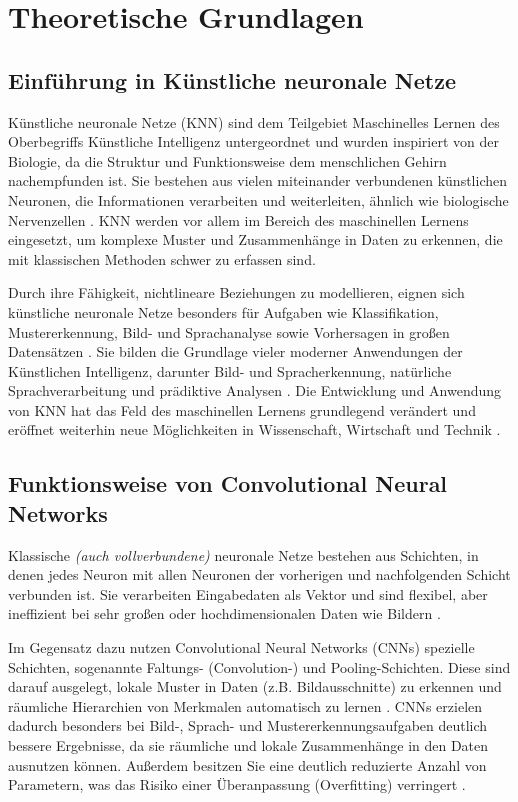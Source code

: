 \chapter{Theoretische Grundlagen} 

\label{TheoretischeGrundlagen} 

\section{Einführung in Künstliche neuronale Netze}
    Künstliche neuronale Netze (KNN) sind dem Teilgebiet Maschinelles Lernen des Oberbegriffs Künstliche Intelligenz untergeordnet und wurden inspiriert von der Biologie, da die Struktur und Funktionsweise dem menschlichen Gehirn nachempfunden ist. Sie bestehen aus vielen miteinander verbundenen künstlichen Neuronen, die Informationen verarbeiten und weiterleiten, ähnlich wie biologische Nervenzellen \cite{Ravi2019, Wang1999Artificial}. KNN werden vor allem im Bereich des maschinellen Lernens eingesetzt, um komplexe Muster und Zusammenhänge in Daten zu erkennen, die mit klassischen Methoden schwer zu erfassen sind.

    Durch ihre Fähigkeit, nichtlineare Beziehungen zu modellieren, eignen sich künstliche neuronale Netze besonders für Aufgaben wie Klassifikation, Mustererkennung, Bild- und Sprachanalyse sowie Vorhersagen in gro{\ss}en Datensätzen \cite{So2009Overview}. 
    Sie bilden die Grundlage vieler moderner Anwendungen der Künstlichen Intelligenz, darunter Bild- und Spracherkennung, natürliche Sprachverarbeitung und prädiktive Analysen \cite{Ravi2019}. 
    Die Entwicklung und Anwendung von KNN hat das Feld des maschinellen Lernens grundlegend verändert und eröffnet weiterhin neue Möglichkeiten in Wissenschaft, Wirtschaft und Technik \cite{So2009Overview}.

\section{Funktionsweise von Convolutional Neural Networks}
    Klassische \textit{(auch vollverbundene)} neuronale Netze bestehen aus Schichten, in denen jedes Neuron mit allen Neuronen der vorherigen und nachfolgenden Schicht verbunden ist. Sie verarbeiten Eingabedaten als Vektor und sind flexibel, aber ineffizient bei sehr gro{\ss}en oder hochdimensionalen Daten wie Bildern \cite{Albawi2017Understanding}.

    Im Gegensatz dazu nutzen Convolutional Neural Networks (CNNs) spezielle Schichten, sogenannte Faltungs- (Convolution-) und Pooling-Schichten. Diese sind darauf ausgelegt, lokale Muster in Daten (z.B. Bildausschnitte) zu erkennen und räumliche Hierarchien von Merkmalen automatisch zu lernen \cite{Krichen2023Convolutional,Yamashita2018Convolutional}.
    CNNs erzielen dadurch besonders bei Bild-, Sprach- und Mustererkennungsaufgaben deutlich bessere Ergebnisse, da sie räumliche und lokale Zusammenhänge in den Daten ausnutzen können. Au{\ss}erdem besitzen Sie eine deutlich reduzierte Anzahl von Parametern, was das Risiko einer Überanpassung (Overfitting) verringert \cite{Krichen2023Convolutional}.

